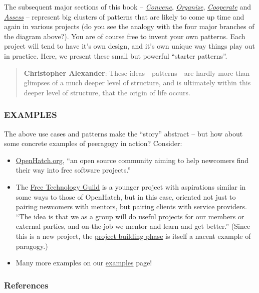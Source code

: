 The subsequent major sections of this book --
\href{http://peeragogy.org/convene/}{\emph{Convene}},
\href{http://peeragogy.org/organize/}{\emph{Organize}},
\href{http://peeragogy.org/facilitate/}{\emph{Cooperate}} and
\href{http://peeragogy.org/assessment/}{\emph{Assess}} -- represent big
clusters of patterns that are likely to come up time and again in
various projects (do you see the analogy with the four major branches of
the diagram above?). You are of course free to invent your own patterns.
Each project will tend to have it's own design, and it's own unique way
things play out in practice. Here, we present these small but powerful
``starter patterns''.

\begin{quote}
\textbf{Christopher Alexander}: These ideas---patterns---are hardly more
than glimpses of a much deeper level of structure, and is ultimately
within this deeper level of structure, that the origin of life occurs.
\end{quote}
\subsubsection{\textbf{EXAMPLES}}

The above use cases and patterns make the ``story'' abstract -- but how
about some concrete examples of peeragogy in action? Consider:

\begin{itemize}
\item
  \href{http://openhatch.org/}{OpenHatch.org}, ``an open source
  community aiming to help newcomers find their way into free software
  projects.''
\item
  The
  \href{http://campus.ftacademy.org/wiki/index.php/Free\_Technology\_Guild}{Free
  Technology Guild} is a younger project with aspirations similar in
  some ways to those of OpenHatch, but in this case, oriented not just
  to pairing newcomers with mentors, but pairing clients with service
  providers. ``The idea is that we as a group will do useful projects
  for our members or external parties, and on-the-job we mentor and
  learn and get better.'' (Since this is a new project, the
  \href{http://campus.ftacademy.org/community/pg/groups/8500/free-technology-guild-working-group/}{project
  building phase} is itself a nacent example of paragogy.)
\item
  Many more examples on our
  \href{http://peeragogy.org/examples/}{examples} page!
\end{itemize}
\subsubsection{References}

